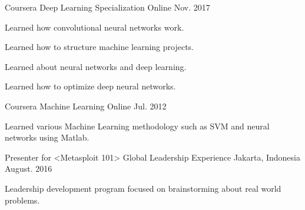 

\begin{cventries}

  \cventry
  {Coursera} %
  {Deep Learning Specialization} %
  {Online} %
  {Nov. 2017} %
  {
    \begin{cvitems} %
      \item {Learned how convolutional neural networks work.}
      \item {Learned how to structure machine learning projects.}
      \item {Learned about neural networks and deep learning. }
      \item {Learned how to optimize deep neural networks.}
    \end{cvitems}
  }

  \cventry
  {Coursera} %
  {Machine Learning} %
  {Online} %
  {Jul. 2012} %
  {
    \begin{cvitems} %
      \item {Learned various Machine Learning methodology such as SVM and neural networks using Matlab.}
    \end{cvitems}
  }

  \cventry
  {Presenter for <Metasploit 101>} %
  {Global Leadership Experience} %
  {Jakarta, Indonesia} %
  {August. 2016} %
  {
    \begin{cvitems} %
      \item {Leadership development program focused on brainstorming about real world problems.}
    \end{cvitems}
  }

\end{cventries}
